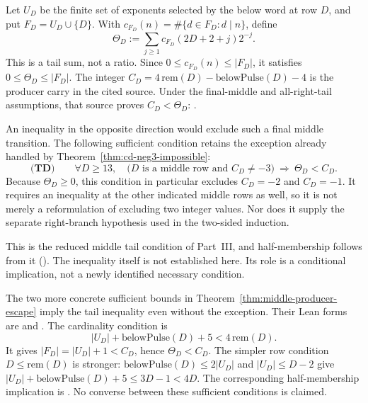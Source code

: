 \begin{rem}
\label{rem:tail-dominance-open}
Let $U_D$ be the finite set of exponents selected by the below
word at row $D$, and put $F_D=U_D\cup\{D\}$.  With
$c_{F_D}(n)=\#\{d\in F_D:d\mid n\}$, define
\[
 \Theta_D:=\sum_{j\ge1}c_{F_D}(2D+2+j)2^{-j}.
\]
This is a tail sum, not a ratio.  Since
$0\le c_{F_D}(n)\le |F_D|$, it satisfies
$0\le\Theta_D\le |F_D|$.  The integer
$C_D=4\,\mathrm{rem}(D)-\mathrm{belowPulse}(D)-4$
is the producer carry in the cited source.  Under the final-middle
and all-right-tail assumptions, that source proves $C_D<\Theta_D$:
.

An inequality in the opposite direction would exclude such a final
middle transition.  The following sufficient condition retains the
exception already handled by Theorem~\ref{thm:cd-neg3-impossible}:
\[
 \textbf{(TD)}\qquad
 \forall D\ge13,\quad
 \bigl(D\text{ is a middle row and }C_D\ne-3\bigr)
 \ \Longrightarrow\ \Theta_D<C_D.
\]
Because $\Theta_D\ge0$, this condition in particular excludes
$C_D=-2$ and $C_D=-1$.  It requires an inequality at the other indicated
middle rows as well, so it is not merely a reformulation of excluding
two integer values.  Nor does it supply the separate right-branch
hypothesis used in the two-sided induction.

This is the reduced middle tail condition of Part~III, and half-membership follows from it
().
The inequality itself is not established here.  Its role is a
conditional implication, not a newly identified necessary condition.

The two more concrete sufficient bounds in
Theorem~\ref{thm:middle-producer-escape} imply the tail inequality even
without the exception.  Their Lean forms are
and
.
The cardinality condition is
\[
 |U_D|+\mathrm{belowPulse}(D)+5<4\,\mathrm{rem}(D).
\]
It gives $|F_D|=|U_D|+1<C_D$, hence $\Theta_D<C_D$.
The simpler row condition $D\le\mathrm{rem}(D)$ is stronger:
$\mathrm{belowPulse}(D)\le2|U_D|$ and $|U_D|\le D-2$ give
$|U_D|+\mathrm{belowPulse}(D)+5\le3D-1<4D$.
The corresponding half-membership implication is
.
No converse between these sufficient conditions is claimed.
\end{rem}

